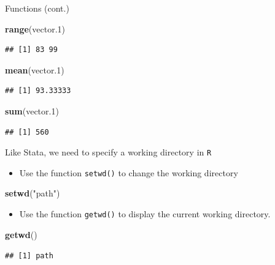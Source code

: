 \documentclass[ignorenonframetext,]{beamer}
\newenvironment{Shaded}{\begin{snugshade}}{\end{snugshade}}
\newcommand{\KeywordTok}[1]{\textcolor[rgb]{0.13,0.29,0.53}{\textbf{#1}}}
\newcommand{\DecValTok}[1]{\textcolor[rgb]{0.00,0.00,0.81}{#1}}
\newcommand{\StringTok}[1]{\textcolor[rgb]{0.31,0.60,0.02}{#1}}
\newcommand{\NormalTok}[1]{#1}
\providecommand{\tightlist}{%
	\setlength{\itemsep}{0pt}\setlength{\parskip}{0pt}}
\begin{document}
\begin{frame}[fragile]{Functions (cont.)}

\begin{Shaded}
\begin{Highlighting}[]
\KeywordTok{range}\NormalTok{(vector.}\DecValTok{1}\NormalTok{)}
\end{Highlighting}
\end{Shaded}

\begin{verbatim}
## [1] 83 99
\end{verbatim}

\begin{Shaded}
\begin{Highlighting}[]
\KeywordTok{mean}\NormalTok{(vector.}\DecValTok{1}\NormalTok{)}
\end{Highlighting}
\end{Shaded}

\begin{verbatim}
## [1] 93.33333
\end{verbatim}

\begin{Shaded}
\begin{Highlighting}[]
\KeywordTok{sum}\NormalTok{(vector.}\DecValTok{1}\NormalTok{)}
\end{Highlighting}
\end{Shaded}

\begin{verbatim}
## [1] 560
\end{verbatim}

\end{frame}

\begin{frame}[fragile]{Like Stata, we need to specify a working
directory in \texttt{R}}

\begin{itemize}
\tightlist
\item
  Use the function \texttt{setwd()} to change the working directory
\end{itemize}

\begin{Shaded}
\begin{Highlighting}[]
\KeywordTok{setwd}\NormalTok{(}\StringTok{"path"}\NormalTok{)}
\end{Highlighting}
\end{Shaded}

\begin{itemize}
\tightlist
\item
  Use the function \texttt{getwd()} to display the current working
  directory.
\end{itemize}

\begin{Shaded}
\begin{Highlighting}[]
\KeywordTok{getwd}\NormalTok{()}
\end{Highlighting}
\end{Shaded}

\texttt{\#\#\ {[}1{]}\ path}

\end{frame}
\end{document}
